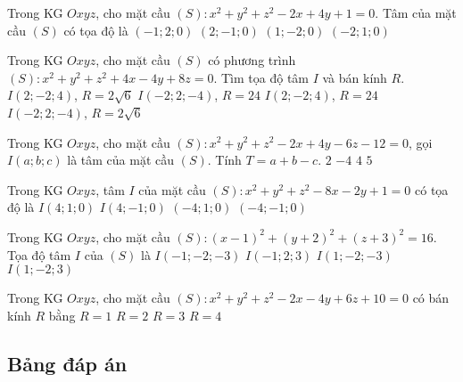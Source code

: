\begin{ex}%
	Trong KG $Oxyz$, cho mặt cầu $(S)\colon x^2+y^2+z^2-2x+4y+1=0$. Tâm của mặt cầu $(S)$ có tọa độ là
	\choice
	{$(-1;2;0)$}
	{$(2;-1;0)$}
	{\True $(1;-2;0)$}
	{$(-2;1;0)$}
\end{ex}
\begin{ex}%
	Trong KG $Oxyz$, cho mặt cầu $(S)$ có phương trình $(S)\colon x^2+y^2+z^2+4x-4y+8z=0$. Tìm tọa độ tâm $I$ và bán kính $R$.
	\choice
	{$I(2;-2;4)$, $R=2\sqrt{6}$}
	{$I(-2;2;-4)$, $R=24$}
	{$I(2;-2;4)$, $R=24$}
	{\True $I(-2;2;-4)$, $R=2\sqrt{6}$}
\end{ex}
\begin{ex}%
	Trong KG $Oxyz$, cho mặt cầu $(S)\colon x^2+y^2+z^2-2x+4y-6z-12=0$, gọi $I(a;b;c)$ là tâm của mặt cầu $(S)$. Tính $T=a+b-c$.
	\choice
	{$2$}
	{\True $-4$}
	{$4$}
	{$5$}
\end{ex}
\begin{ex}%
	Trong KG $Oxyz$, tâm $I$ của mặt cầu $(S)\colon x^2+y^2+z^2-8x-2y+1=0$ có tọa độ là
	\choice
	{\True $I(4;1;0)$}
	{$I(4;-1;0)$}
	{$(-4;1;0)$}
	{$(-4;-1;0)$}
\end{ex}
\begin{ex}%
	Trong KG $Oxyz$, cho mặt cầu $(S)\colon (x-1)^2+(y+2)^2+(z+3)^2=16$. Tọa độ tâm $I$ của $(S)$ là
	\choice
	{$I(-1;-2;-3)$}
	{$I(-1;2;3)$}
	{\True $I(1;-2;-3)$}
	{$I(1;-2;3)$}
\end{ex}
\begin{ex}%
	Trong KG $Oxyz$, cho mặt cầu $(S)\colon x^2+y^2+z^2-2x-4y+6z+10=0$ có bán kính $R$ bằng
	\choice
	{$R=1$}
	{\True $R=2$}
	{$R=3$}
	{$R=4$}
\end{ex}
\subsection{Bảng đáp án}

